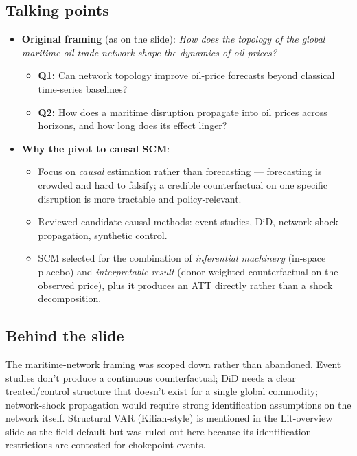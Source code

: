\documentclass[11pt,a4paper]{article}
\newcommand{\highlight}[1]{\textcolor{accent}{\textbf{#1}}}
\begin{document}
\subsection{Talking points}
\begin{itemize}
  \item \highlight{Original framing} (as on the slide): \emph{How does the topology of the global maritime oil trade network shape the dynamics of oil prices?}
  \begin{itemize}
    \item \textbf{Q1:} Can network topology improve oil-price forecasts beyond classical time-series baselines?
    \item \textbf{Q2:} How does a maritime disruption propagate into oil prices across horizons, and how long does its effect linger?
  \end{itemize}
  \item \highlight{Why the pivot to causal SCM}:
  \begin{itemize}
    \item Focus on \emph{causal} estimation rather than forecasting --- forecasting is crowded and hard to falsify; a credible counterfactual on one specific disruption is more tractable and policy-relevant.
    \item Reviewed candidate causal methods: event studies, DiD, network-shock propagation, synthetic control.
    \item SCM selected for the combination of \emph{inferential machinery} (in-space placebo) and \emph{interpretable result} (donor-weighted counterfactual on the observed price), plus it produces an ATT directly rather than a shock decomposition.
  \end{itemize}
\end{itemize}

\subsection{Behind the slide}
The maritime-network framing was scoped down rather than abandoned. Event studies don't produce a continuous counterfactual; DiD needs a clear treated/control structure that doesn't exist for a single global commodity; network-shock propagation would require strong identification assumptions on the network itself. Structural VAR (Kilian-style) is mentioned in the Lit-overview slide as the field default but was ruled out here because its identification restrictions are contested for chokepoint events.
\end{document}
